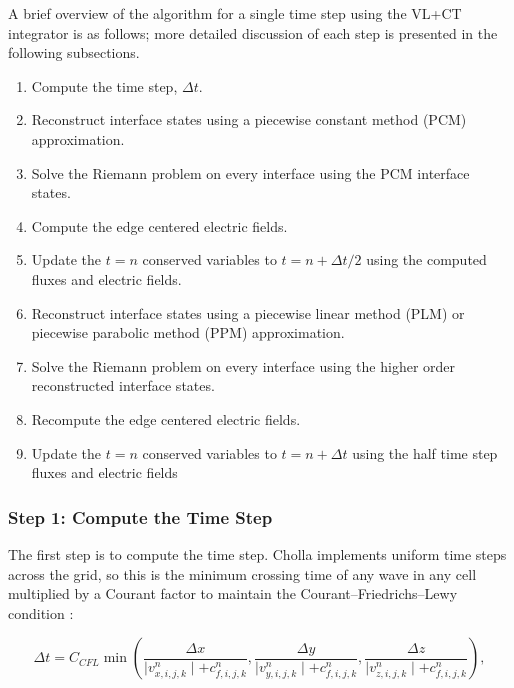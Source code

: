 A brief overview of the algorithm for a single time step using the VL+CT integrator is as follows; more detailed discussion of each step is presented in the following subsections.

\begin{enumerate}
    \item Compute the time step, $\Delta t$.
    \item Reconstruct interface states using a piecewise constant method (PCM) approximation.
    \item Solve the Riemann problem on every interface using the PCM interface states.
    \item Compute the edge centered electric fields.
    \item Update the $t=n$ conserved variables to $t=n+\Delta t/2$ using the computed fluxes and electric fields.
    \item Reconstruct interface states using a piecewise linear method (PLM) or piecewise parabolic method (PPM) approximation.
    \item Solve the Riemann problem on every interface using the higher order reconstructed interface states.
    \item Recompute the edge centered electric fields.
    \item Update the $t=n$ conserved variables to $t=n+\Delta t$ using the half time step fluxes and electric fields
\end{enumerate}


\subsubsection{Step 1: Compute the Time Step}
\label{vlct:dt}

The first step is to compute the time step. Cholla implements uniform time steps across the grid, so this is the minimum crossing time of any wave in any cell multiplied by a Courant factor to maintain the Courant–Friedrichs–Lewy condition \cite{cfl}:

\begin{equation}
        \label{eqn:dt}
        \Delta t = C_{CFL} \min \left(
            \frac{\Delta x}{\mid v^n_{x,i,j,k} \mid + c^n_{f,i,j,k}},
            \frac{\Delta y}{\mid v^n_{y,i,j,k} \mid + c^n_{f,i,j,k}}, 
            \frac{\Delta z}{\mid v^n_{z,i,j,k} \mid + c^n_{f,i,j,k}}
        \right),
\end{equation}

